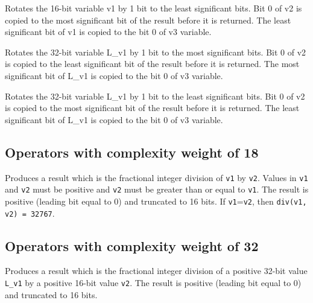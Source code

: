  

Rotates the 16-bit variable v1 by 1 bit to the least significant bits.
Bit 0 of v2 is copied to the most significant bit of the result before it is returned.
The least significant bit of v1 is copied to the bit 0 of v3 variable.

 

Rotates the 32-bit variable L\_v1 by 1 bit to the most significant bits.
Bit 0 of v2 is copied to the least significant bit of the result before it is returned.
The most significant bit of L\_v1 is copied to the bit 0 of v3 variable.

 

Rotates the 32-bit variable L\_v1 by 1 bit to the least significant bits.
Bit 0 of v2 is copied to the most significant bit of the result before it is returned.
The least significant bit of L\_v1 is copied to the bit 0 of v3 variable.

\subsection{Operators with complexity weight of 18}


Produces a result which is the fractional integer division of {\tt v1} by {\tt v2}.
Values in {\tt v1} and {\tt v2} must be positive and {\tt v2} must be greater than or equal to {\tt v1}.
The result is positive (leading bit equal to 0) and truncated to 16 bits.
If {\tt v1}={\tt v2}, then {\tt div(v1, v2) = 32767}.

\subsection{Operators with complexity weight of 32}


Produces a result which is the fractional integer division of a positive 32-bit value {\tt L\_v1} by a positive 16-bit value {\tt v2}.
The result is positive (leading bit equal to 0) and truncated to 16 bits.

